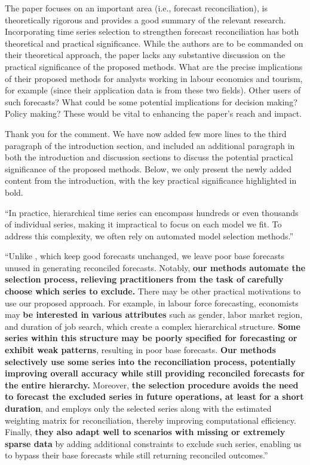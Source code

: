 \documentclass[11pt,a4paper,]{article}
\renewenvironment{quote}
               {\list{}{\rightmargin\leftmargin}%
                \item\relax\color[RGB]{0,150,0}}
               {\endlist}
\begin{document}
The paper focuses on an important area (i.e., forecast reconciliation),
is theoretically rigorous and provides a good summary of the relevant
research. Incorporating time series selection to strengthen forecast
reconciliation has both theoretical and practical significance. While
the authors are to be commanded on their theoretical approach, the paper
lacks any substantive discussion on the practical significance of the
proposed methods. What are the precise implications of their proposed
methods for analysts working in labour economics and tourism, for
example (since their application data is from these two fields). Other
users of such forecasts? What could be some potential implications for
decision making? Policy making? These would be vital to enhancing the
paper's reach and impact.

\begin{quote}
Thank you for the comment. We have now added few more lines to the third
paragraph of the introduction section, and included an additional
paragraph in both the introduction and discussion sections to discuss
the potential practical significance of the proposed methods. Below, we
only present the newly added content from the introduction, with the key
practical significance highlighted in bold.

``In practice, hierarchical time series can encompass hundreds or even
thousands of individual series, making it impractical to focus on each
model we fit. To address this complexity, we often rely on automated
model selection methods.''

``Unlike \textcite{Zhang2023-op}, which keep good forecasts unchanged,
we leave poor base forecasts unused in generating reconciled forecasts.
Notably, \textbf{our methods automate the selection process, relieving
practitioners from the task of carefully choose which series to
exclude.} There may be other practical motivations to use our proposed
approach. For example, in labour force forecasting, economists may
\textbf{be interested in various attributes} such as gender, labor
market region, and duration of job search, which create a complex
hierarchical structure. \textbf{Some series within this structure may be
poorly specified for forecasting or exhibit weak patterns}, resulting in
poor base forecasts. \textbf{Our methods selectively use some series
into the reconciliation process, potentially improving overall accuracy
while still providing reconciled forecasts for the entire hierarchy.}
Moreover, \textbf{the selection procedure avoids the need to forecast
the excluded series in future operations, at least for a short
duration}, and employs only the selected series along with the estimated
weighting matrix for reconciliation, thereby improving computational
efficiency. Finally, \textbf{they also adapt well to scenarios with
missing or extremely sparse data} by adding additional constraints to
exclude such series, enabling us to bypass their base forecasts while
still returning reconciled outcomes.''
\end{quote}
\end{document}
